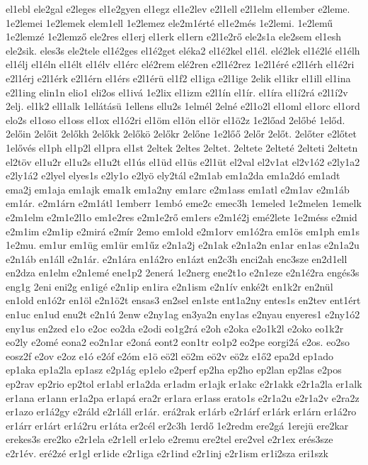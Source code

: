 {el1ebl
ele2gal
e2leges
el1e2gyen
el1egz
el1e2lev
e2l1ell
e2l1elm
el1ember
e2leme.
1e2lemei
1e2lemek
elem1ell
1e2lemez
ele2m1érté
el1e2més
1e2lemi.
1e2lemű
1e2lemzé
1e2lemző
ele2res
el1erj
el1erk
el1ern
e2l1e2rő
ele2s1a
ele2sem
el1esh
ele2sik.
eles3s
ele2tele
el1é2ges
el1é2get
eléka2
el1é2kel
el1él.
elé2lek
el1é2lé
el1élh
el1élj
el1éln
el1élt
el1élv
el1érc
elé2rem
elé2ren
e2l1é2rez
1e2l1éré
e2l1érh
el1é2ri
e2l1érj
e2l1érk
e2l1érn
el1érs
e2l1érü
el1f2
el1iga
e2l1ige
2elik
el1ikr
el1ill
el1ina
e2l1ing
elin1n
elio1
eli2os
el1ivá
1e2lix
el1izm
e2l1ín
el1ír.
el1íra
el1í2rá
e2l1í2v
2elj.
el1k2
ell1alk
1ellátásü
1ellens
ellu2s
1elmél
2elné
e2l1o2l
el1oml
el1orc
el1ord
elo2s
el1oso
el1oss
el1ox
el1ó2ri
el1öm
el1ön
el1ör
el1ö2z
1e2lőad
2előbé
1előd.
2előin
2előit
2előkh
2előkk
2előkö
2előkr
2előne
1e2lőő
2előr
2előt.
2előter
e2lőtet
1elővés
el1ph
el1p2l
el1pra
el1st
2eltek
2eltes
2eltet.
2eltete
2elteté
2elteti
2eltetn
el2töv
el1u2r
el1u2s
el1u2t
el1ús
el1üd
el1üs
e2l1üt
el2val
el2v1at
el2v1ó2
e2ly1a2
e2ly1á2
e2lyel
elyes1s
e2ly1o
e2lyö
ely2tál
e2m1ab
em1a2da
em1a2dó
em1adt
ema2j
em1aja
em1ajk
ema1k
em1a2ny
em1arc
e2m1ass
em1atl
e2m1av
e2m1áb
em1ár.
e2m1árn
e2m1átl
1emberr
1embó
eme2c
emec3h
1emeled
1e2melen
1emelk
e2m1elm
e2m1e2l1o
em1e2res
e2m1e2rő
em1ers
e2m1é2j
emé2lete
1e2méss
e2mid
e2m1im
e2m1ip
e2mirá
e2mír
2emo
em1old
e2m1orv
em1ó2ra
em1ös
em1ph
em1s
1e2mu.
em1ur
em1üg
em1ür
em1űz
e2n1a2j
e2n1ak
e2n1a2n
en1ar
en1as
e2n1a2u
e2n1áb
en1áll
e2n1ár.
e2n1ára
en1á2ro
en1ázt
en2c3h
enci2ah
enc3sze
en2d1ell
en2dza
en1elm
e2n1emé
ene1p2
2enerá
1e2nerg
ene2t1o
e2n1eze
e2n1é2ra
engés3s
eng1g
2eni
eni2g
en1igé
e2n1ip
en1ira
e2n1ism
e2n1ív
enké2t
en1k2r
en2nül
en1old
en1ó2r
en1öl
e2n1ö2t
ensas3
en2sel
en1ste
ent1a2ny
entes1s
en2tev
ent1ért
en1uc
en1ud
enu2t
e2n1ú
2enw
e2ny1ag
en3ya2n
eny1as
e2nyau
enyeres1
e2ny1ó2
eny1us
en2zed
e1o
e2oc
eo2da
e2odi
eo1g2rá
e2oh
e2oka
e2o1k2l
e2oko
eo1k2r
eo2ly
e2omé
eona2
eo2n1ar
e2oná
eont2
eon1tr
eo1p2
eo2pe
eorgi2á
e2os.
eo2so
eosz2f
e2ov
e2oz
e1ó
e2óf
e2óm
e1ö
eö2l
eö2m
eö2v
eö2z
e1ő2
epa2d
ep1ado
ep1aka
ep1a2la
ep1asz
e2p1ág
ep1elo
e2perf
ep2ha
ep2ho
ep2lan
ep2las
e2pos
ep2rav
ep2rio
ep2tol
er1abl
er1a2da
er1adm
er1ajk
er1akc
e2r1akk
e2r1a2la
er1alk
er1ana
er1ann
er1a2pa
er1apá
era2r
er1ara
er1ass
erato1s
e2r1a2u
e2r1a2v
e2ra2z
er1azo
er1á2gy
e2ráld
e2r1áll
er1ár.
erá2rak
er1árb
e2r1árf
er1árk
er1árn
er1á2ro
er1árr
er1árt
er1á2ru
er1áta
er2cél
er2c3h
1erdő
1e2redm
ere2gá
1erejü
ere2kar
erekes3s
ere2ko
e2r1ela
e2r1ell
er1elo
e2remu
ere2tel
ere2vel
e2r1ex
erés3sze
e2r1év.
eré2zé
er1gl
er1ide
e2r1iga
e2r1ind
e2r1inj
e2r1ism
er1i2sza
eri1szk
}
